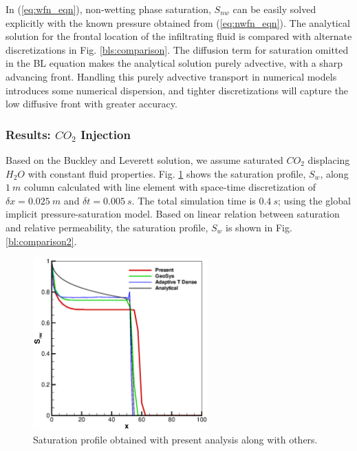 In (\ref{eq:wfn_eqn}), non-wetting phase saturation, $S_{nw}$ can be easily solved explicitly with the known pressure obtained from (\ref{eq:nwfn_eqn}). The analytical solution for the frontal location of the infiltrating fluid is compared with alternate discretizations in Fig. \ref{bls:comparison}. The diffusion term for saturation omitted in the BL equation makes the analytical solution purely advective, with a sharp advancing front. Handling this purely advective transport in numerical models introduces some numerical dispersion, and tighter discretizations will capture the low diffusive front with greater accuracy.

\subsubsection*{Results: $CO_2$ Injection}
Based on the Buckley and Leverett solution, we assume saturated $CO_2$ displacing $H_2O$ with constant fluid properties. Fig. \ref{bl:comparison} shows the saturation profile, $S_w$, along $1~m$ column calculated with line element with space-time discretization of $\delta x = 0.025~m$ and $\delta t = 0.005~s$. The total simulation time is $0.4~s$; using the global implicit pressure-saturation model. Based on linear relation between saturation and relative permeability, the saturation profile, $S_w$ is shown in Fig. \ref{bl:comparison2}.

\begin{figure}[!tbh]
\begin{center}
\includegraphics[width=0.6\textwidth]{chapter_13/figures/fig_13_1_7}
\end{center}
\caption{Saturation profile obtained with present analysis along with others.}
\label{bl:comparison}
\end{figure}

